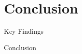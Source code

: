 \documentclass{beamer}
\begin{document}
\section{Conclusion}
\begin{frame}{Key Findings}

\end{frame}

\begin{frame}{Conclusion}
\end{frame}


\begin{frame}[allowframebreaks]
  
  
\end{frame}
\end{document}
